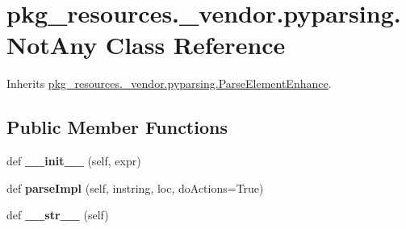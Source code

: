 \hypertarget{classpkg__resources_1_1__vendor_1_1pyparsing_1_1_not_any}{}\section{pkg\+\_\+resources.\+\_\+vendor.\+pyparsing.\+Not\+Any Class Reference}
\label{classpkg__resources_1_1__vendor_1_1pyparsing_1_1_not_any}


Inherits \hyperlink{classpkg__resources_1_1__vendor_1_1pyparsing_1_1_parse_element_enhance}{pkg\+\_\+resources.\+\_\+vendor.\+pyparsing.\+Parse\+Element\+Enhance}.

\subsection*{Public Member Functions}
\begin{DoxyCompactItemize}
\item 
\mbox{\label{classpkg__resources_1_1__vendor_1_1pyparsing_1_1_not_any_a9dfc8ab73a6f40dd44ca806a7a491858}} 
def {\bfseries \+\_\+\+\_\+init\+\_\+\+\_\+} (self, expr)
\item 
\mbox{\label{classpkg__resources_1_1__vendor_1_1pyparsing_1_1_not_any_a5c07b367f56687282310bd48160a18a7}} 
def {\bfseries parse\+Impl} (self, instring, loc, do\+Actions=True)
\item 
\mbox{\label{classpkg__resources_1_1__vendor_1_1pyparsing_1_1_not_any_a9b69c9eb2f6b01529a0c7dfe640c5aaf}} 
def {\bfseries \+\_\+\+\_\+str\+\_\+\+\_\+} (self)
\end{DoxyCompactItemize}
